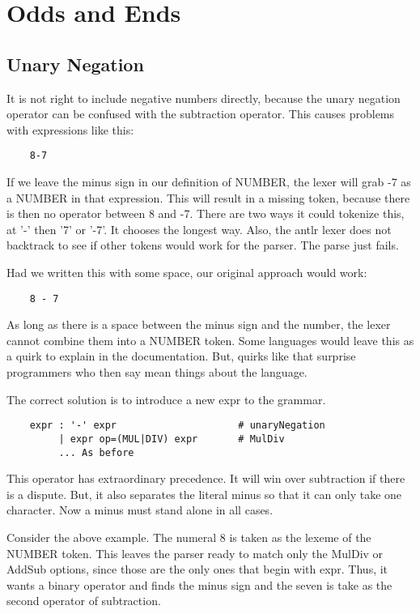 \chapter{Odds and Ends}

\section{Unary Negation}

It is not right to include negative numbers directly, because the unary negation
operator can be confused with the subtraction operator. This causes problems
with expressions like this:

{\footnotesize
\begin{verbatim}
    8-7
\end{verbatim}
}

If we leave the minus sign in our definition of NUMBER, the lexer will
grab -7 as a NUMBER in that expression. This will result in a missing
token, because there is then no operator between 8 and -7. There are
two ways it could tokenize this, at '-' then '7' or '-7'. It chooses
the longest way. Also, the antlr lexer does not backtrack to see if other
tokens would work for the parser. The parse just fails.

Had we written this with some space, our original approach would work:

{\footnotesize
\begin{verbatim}
    8 - 7
\end{verbatim}
}

As long as there is a space between the minus sign and the number,
the lexer cannot combine them into a NUMBER token. Some languages would
leave this as a quirk to explain in the documentation. But, quirks like
that surprise programmers who then say mean things about the language.

The correct solution is to introduce a new expr to the grammar.

{\footnotesize
\begin{verbatim}
    expr : '-' expr                     # unaryNegation
         | expr op=(MUL|DIV) expr       # MulDiv
         ... As before
\end{verbatim}
}

This operator has extraordinary precedence. It will win over subtraction
if there is a dispute. But, it also separates the literal minus
so that it can only take one character. Now a minus must stand alone in
all cases.

Consider the above example. The numeral 8 is taken as the lexeme of the
NUMBER token. This leaves the parser ready to match only the MulDiv
or AddSub options, since those are the only ones that begin with expr.
Thus, it wants a binary operator and finds the minus sign and the seven
is take as the second operator of subtraction.

